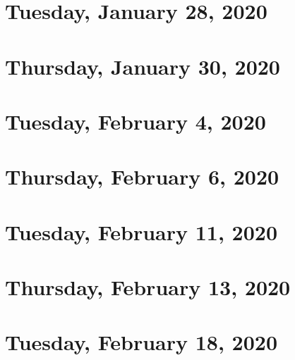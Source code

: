 \documentclass{../mynotes}
\begin{document}
\section{Tuesday, January 28, 2020}
    
\section{Thursday, January 30, 2020}
    

\section{Tuesday, February 4, 2020}
    
\section{Thursday, February 6, 2020}
    
    
\section{Tuesday, February 11, 2020}
    
\section{Thursday, February 13, 2020}
    

\section{Tuesday, February 18, 2020}
    

%     
\end{document}
